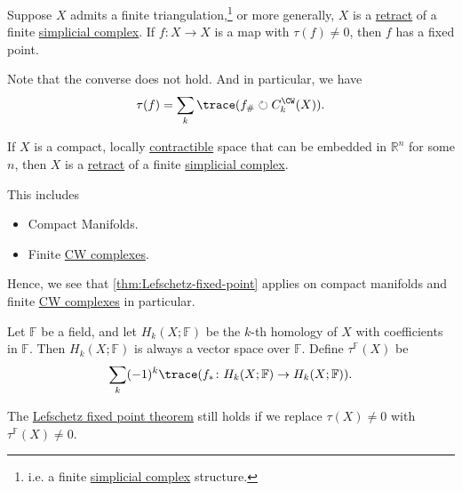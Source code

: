 \begin{theorem}\label{thm:Lefschetz-fixed-point}
	Suppose \(X\) admits a finite triangulation,\footnote{i.e. a finite \hyperref[def:simplicial-complex]{simplicial complex} structure.}
	or more generally, \(X\) is a \hyperref[def:retraction]{retract} of a finite \hyperref[def:simplicial-complex]{simplicial complex}.
	If \(f \colon X \to X\) is a map with \(\tau(f) \neq 0\), then \(f\) has a fixed point.
\end{theorem}
\begin{note}
	Note that the converse does not hold. And in particular, we have
	\[
		\tau (f) = \sum\limits_{k} \trace(f_\# \circlearrowright C^{\CW}_k(X) ).
	\]
\end{note}
\begin{theorem}\label{thm:retract-simplicial-complex}
	If \(X\) is a compact, locally \hyperref[def:contractible]{contractible} space that can be embedded in \(\mathbb{R}^n\) for some \(n\), then \(X\) is a
	\hyperref[def:retraction]{retract} of a finite \hyperref[def:simplicial-complex]{simplicial complex}.
\end{theorem}
\begin{remark}
	This includes
	\begin{itemize}
		\item Compact Manifolds.
		\item Finite \hyperref[def:CW-Complex]{CW complexes}.
	\end{itemize}
	Hence, we see that \autoref{thm:Lefschetz-fixed-point} applies on compact manifolds and finite \hyperref[def:CW-Complex]{CW complexes}
	in particular.
\end{remark}
\begin{definition}\label{def:Lefschetz-number-better}
	Let \(\mathbb{F}\) be a field, and let \(H_k(X; \mathbb{F})\) be the \(k\)-th homology of \(X\) with coefficients in \(\mathbb{F}\).
	Then \(H_k(X; \mathbb{F})\) is always a vector space over \(\mathbb{F}\). Define \(\tau^{\mathbb{F}}(X)\) be
	\[
		\sum_k (-1)^k \trace(f_\ast \colon H_k(X; \mathbb{F}) \to H_k(X; \mathbb{F})).
	\]
\end{definition}
\begin{remark}
	The \hyperref[thm:Lefschetz-fixed-point]{Lefschetz fixed point theorem} still holds if we replace \(\tau(X) \neq 0\) with \(\tau^{\mathbb{F}}(X) \neq 0\).
\end{remark}

